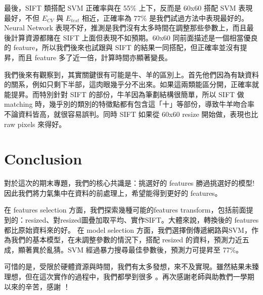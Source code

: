 最後，SIFT 類搭配 SVM 正確率與在 55\% 上下，反而是 60x60 搭配 SVM 表現最好，不但 $E_{CV}$ 與 $E_{test}$ 相近，正確率為 77\% 是我們試過方法中表現最好的。Neural Network 表現不好，推測是我們沒有太多時間在調整那些參數上，而且最後計算資源都賭在 SIFT 上面但表現不如預期。60x60 同前面描述是一個相當優良的 feature，所以我們後來也試跟與 SIFT 的結果一同搭配，但正確率並沒有提昇，而且 feature 多了近一倍，計算時間亦顯著變長。

我們後來有觀察到，其實關鍵很有可能是牛、羊的區別上。首先他們因為有缺資料的關系，例如只剩下半部，這肉眼幾乎分不出來。如果這兩類能區分開，正確率就能提昇。而特別針對 SIFT 的部份，牛羊因為筆劃結構很簡單，所以 SIFT 做 matching 時，幾乎別的類別的特徵點都有包含這「十」等部份，導致牛羊吻合率不論資料皆高，就很容易誤判。同時 SIFT 如果從 60x60 resize 開始做，表現也比 raw pixels 來得好。


\section{Conclusion}
對於這次的期末專題，我們的核心共識是：挑選好的 features 勝過挑選好的模型! 因此我們將力氣集中在資料的前處理上，希望能得到更好的 features。

在 features selection 方面，我們探索幾種可能的features transform，包括前面提到的：resized、對resized圖疊加取平均、實作SIFT。大體來說，轉換後的 features 都比原始資料來的好。
在 model selection 方面，我們選擇倒傳遞網路與SVM，作為我們的基本模型，在未調整參數的情況下，搭配 resized 的資料，預測力近五成，顯著異於亂猜。SVM 經過暴力搜尋最佳參數後，預測力可提昇至 77\%。

可惜的是，受限於硬體資源與時間，我們有太多發想，來不及實現。雖然結果未臻理想，但在這次實作的過程中，我們都學到很多 。再次感謝老師與助教們一學期以來的辛苦，感謝 ！

